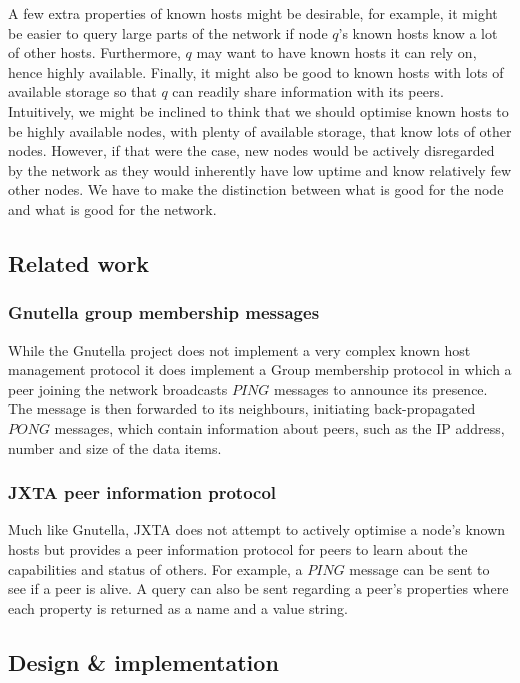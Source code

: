A few extra properties of known hosts might be desirable, for example, it might be easier to query large parts of the network if node $q$'s known hosts know a lot of other hosts. Furthermore, $q$ may want to have known hosts it can rely on, hence highly available. Finally, it might also be good to known hosts with lots of available storage so that $q$ can readily share information with its peers. Intuitively, we might be inclined to think that we should optimise known hosts to be highly available nodes, with plenty of available storage, that know lots of other nodes. However, if that were the case, new nodes would be actively disregarded by the network as they would inherently have low uptime and know relatively few other nodes. We have to make the distinction between what is good for the node and what is good for the network.

\subsection{Related work}

\subsubsection{Gnutella group membership messages}

While the Gnutella project does not implement a very complex known host management protocol it does implement a Group membership protocol in which a peer joining the network broadcasts $PING$ messages to announce its presence. The message is then forwarded to its neighbours, initiating back-propagated $PONG$ messages, which contain information about peers, such as the IP address, number and size of the data items.\cite{lua2005survey}

\subsubsection{JXTA peer information protocol}

Much like Gnutella, JXTA does not attempt to actively optimise a node's known hosts but provides a peer information protocol for peers to learn about the capabilities and status of others. For example, a $PING$ message can be sent to see if a peer is alive. A query can also be sent regarding a peer’s properties where each property is returned as a name and a value string.

\subsection{Design \& implementation}

